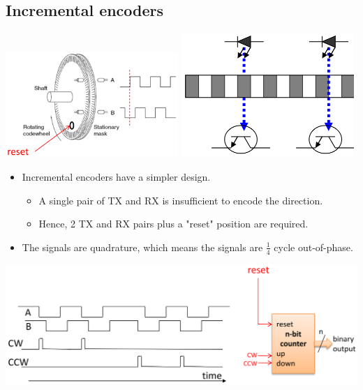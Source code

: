 \documentclass[11pt]{article}
\begin{document}
\subsection{Incremental encoders}
\label{sec:org9c26f94}
\begin{center}
\includegraphics[width=0.49\textwidth]{./images/incremental-encoder-diagram.png}
\includegraphics[width=0.49\textwidth]{./images/incremental-encoder-led-diagram.png}
\end{center}
\begin{itemize}
\item Incremental encoders have a simpler design.
\begin{itemize}
\item A single pair of TX and RX is insufficient to encode the direction.
\item Hence, 2 TX and RX pairs plus a "reset" position are required.
\end{itemize}
\item The signals are quadrature, which means the signals are \(\frac{1}{4}\) cycle out-of-phase.
\end{itemize}

\begin{center}
\includegraphics[width=.9\linewidth]{./images/incremental-encoder-signal.png}
\end{center}
\end{document}
